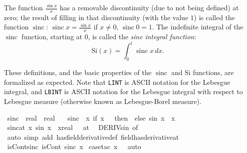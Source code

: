 \documentclass[leqno]{article}
\theoremstyle{definition}
\newcommand\sinc{\mathop{\text{sinc}}\nolimits}
\newcommand\Si{\text{Si}}
\begin{document}
The function $\frac{\sin x}{x}$ has a removable discontinuity (due to not being defined) at zero; the result of filling in that discontinuity (with the value $1$) is called the function $\sinc$: $\sinc x = \frac{\sin x}{x}$ if $x \ne 0$, $\sinc 0 = 1$. The indefinite integral of the $\sinc$ function, starting at $0$, is called the {\em sine integral function}:
\[ \Si(x) = \int_0^t \sinc x \, dx. \]

These definitions, and the basic properties of the $\sinc$ and $\Si$ functions, are formalized as expected. Note that \texttt{LINT} is ASCII notation for the Lebesgue integral, and \texttt{LBINT} is ASCII notation for the Lebesgue integral with respect to Lebesgue measure (otherwise known as Lebesgue-Borel measure).\phantom{)}

\medskip

\begin{isabellebody}
\isamarkupfalse%
\ sinc\ {\isacharcolon}{\isacharcolon}\ {\isachardoublequoteopen}real\ {\isasymRightarrow}\ real{\isachardoublequoteclose}\ \isanewline
\ \ {\isachardoublequoteopen}sinc\ {\isasymequiv}\ {\isacharparenleft}{\isasymlambda}x{\isachardot}\ if\ x\ {\isacharequal}\ {}\ then\ {}\ else\ sin\ x\ {\isacharslash}\ x{\isacharparenright}{\isachardoublequoteclose}\isanewline
\isanewline
{}\isamarkupfalse%
\ sinc{\isacharunderscore}at{\isacharunderscore}{}{\isacharcolon}\ {\isachardoublequoteopen}{\isacharparenleft}{\isacharparenleft}{\isasymlambda}x{\isachardot}\ sin\ x\ {\isacharslash}\ x{\isacharcolon}{\isacharcolon}real{\isacharparenright}\ {\isacharminus}{\isacharminus}{\isacharminus}{\isachargreater}\ {}{\isacharparenright}\ {\isacharparenleft}at\ {}{\isacharparenright}{\isachardoublequoteclose}\isanewline
{}\isamarkupfalse%
\ DERIV{\isacharunderscore}sin\ {\isacharbrackleft}of\ {}{\isacharbrackright}\ \isamarkupfalse%
\ {\isacharparenleft}auto\ simp\ add{\isacharcolon}\ has{\isacharunderscore}field{\isacharunderscore}derivative{\isacharunderscore}def\ field{\isacharunderscore}has{\isacharunderscore}derivative{\isacharunderscore}at{\isacharparenright}%
\isanewline\isanewline
{}\isamarkupfalse%
\ isCont{\isacharunderscore}sinc{\isacharcolon}\ {\isachardoublequoteopen}isCont\ sinc\ x{\isachardoublequoteclose}\isanewline
{}\isamarkupfalse%
\ {\isacharparenleft}case{\isacharunderscore}tac\ {\isachardoublequoteopen}x\ {\isacharequal}\ {}{\isachardoublequoteclose}{\isacharcomma}\ auto{\isacharparenright}\isanewline

\end{isabellebody}
\end{document}
